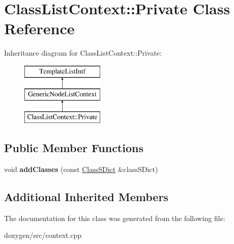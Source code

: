 \hypertarget{class_class_list_context_1_1_private}{}\section{Class\+List\+Context\+::Private Class Reference}
\label{class_class_list_context_1_1_private}
Inheritance diagram for Class\+List\+Context\+::Private\+:\begin{figure}[H]
\begin{center}
\leavevmode
\includegraphics[height=3.000000cm]{class_class_list_context_1_1_private}
\end{center}
\end{figure}
\subsection*{Public Member Functions}
\begin{DoxyCompactItemize}
\item 
\mbox{\label{class_class_list_context_1_1_private_aa5585627bcf84cc020682e882278e420}} 
void {\bfseries add\+Classes} (const \mbox{\hyperlink{class_class_s_dict}{Class\+S\+Dict}} \&class\+S\+Dict)
\end{DoxyCompactItemize}
\subsection*{Additional Inherited Members}


The documentation for this class was generated from the following file\+:\begin{DoxyCompactItemize}
\item 
doxygen/src/context.\+cpp\end{DoxyCompactItemize}

